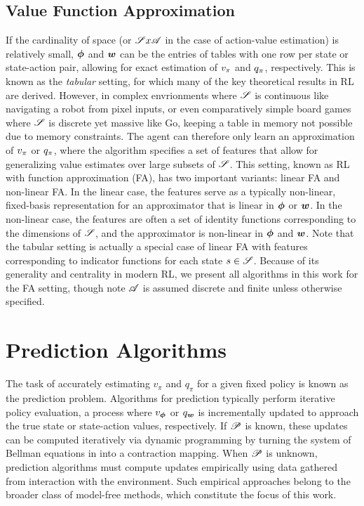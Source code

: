 \subsection{Value Function Approximation} 
If the cardinality of \stateSpace space (or $\mathscr{S} x \mathscr{A}$ in the case of action-value estimation) is relatively small, %
${\bm \phi}$ and ${\bm w}$ can be the entries of tables with one row per state or state-action pair, allowing for exact estimation of $v_{\pi}$ and $q_{\pi}$, respectively. This is known as the \textit{tabular} setting, for which many of the key theoretical results in RL are derived. %
However, in complex envrionments where $\mathscr{S}$ is continuous like navigating a robot from pixel inputs, or even comparatively simple board games where $\mathscr{S}$ is discrete yet massive like Go, keeping a table in memory not possible due to memory constraints. The agent can therefore only learn an approximation of $v_{\pi}$ or $q_{\pi}$, where the algorithm specifies a set of features %
that allow for generalizing value estimates over large subsets of $\mathscr{S}$. This setting, known as RL with function approximation (FA), has two important variants: linear FA and non-linear FA. In the linear case, the features serve as a typically non-linear, fixed-basis representation for an approximator that is linear in ${\bm \phi}$ or ${\bm w}$. In the non-linear case, the features are often a set of identity functions corresponding to the dimensions of $\mathscr{S}$, and the approximator is non-linear in ${\bm \phi}$ and ${\bm w}$. 
Note that the tabular setting is actually a special case of linear FA with %
features corresponding to indicator functions for each state $s \in \mathscr{S}$. Because of its generality and centrality in modern RL, we present all algorithms in this work for the FA setting, though note $\mathscr{A}$ is assumed discrete and finite unless otherwise specified. 

\section{Prediction Algorithms}
The task of accurately estimating $v_\pi$ and $q_\pi$ for a given fixed policy is known as the prediction problem. Algorithms for prediction typically perform iterative policy evaluation, a process where $v_{\bm \phi}$ or $q_{\bm w}$ is incrementally updated to approach the true state or state-action values, respectively. If $\mathscr{P}$ is known, these updates can be computed iteratively via dynamic programming by turning the system of Bellman equations in  into a contraction mapping. When $\mathscr{P}$ is unknown, prediction algorithms must compute updates empirically using data gathered from interaction with the environment. Such empirical approaches belong to the broader class of model-free methods, which constitute the focus of this work.

